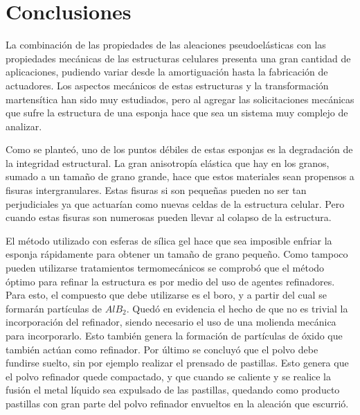 \documentclass[a4paper,12pt,fleqn,twoside,openany]{book}
\begin{document}
 
 

 
 

 
 
\chapter{Conclusiones}
  
 
 La combinación de las propiedades de las aleaciones pseudoelásticas con las propiedades mecánicas de las estructuras celulares presenta una gran cantidad de aplicaciones, pudiendo variar desde la amortiguación hasta la fabricación de actuadores. Los aspectos mecánicos de estas estructuras y la transformación martensítica han sido muy estudiados, pero al agregar las solicitaciones mecánicas que sufre la estructura de una esponja hace que sea un sistema muy complejo de analizar.
 
 Como se planteó, uno de los puntos débiles de estas esponjas es la degradación de la integridad estructural. La gran anisotropía elástica que hay en los granos, sumado a un tamaño de grano grande, hace que estos materiales sean propensos a fisuras intergranulares. Estas fisuras si son pequeñas pueden no ser tan perjudiciales ya que actuarían como nuevas celdas de la estructura celular. Pero cuando estas fisuras son numerosas pueden llevar al colapso de la estructura. 
 
 El método utilizado con esferas de sílica gel hace que sea imposible enfriar la esponja rápidamente para obtener un tamaño de grano pequeño. Como tampoco pueden utilizarse tratamientos termomecánicos se comprobó que el método óptimo para refinar la estructura es por medio del uso de agentes refinadores. Para esto, el compuesto que debe utilizarse es el boro, y a partir del cual se formarán partículas de $AlB_2$. Quedó en evidencia el hecho de que no es trivial la incorporación del refinador, siendo necesario el uso de una molienda mecánica para incorporarlo. Esto también genera la formación de partículas de óxido que también actúan como refinador. Por último se concluyó que el polvo debe fundirse suelto, sin por ejemplo realizar el prensado de pastillas. Esto genera que el polvo refinador quede compactado, y que cuando se caliente y se realice la fusión el metal líquido sea expulsado de las pastillas, quedando como producto pastillas con gran parte del polvo refinador envueltos en la aleación que escurrió.
 
\end{document}

